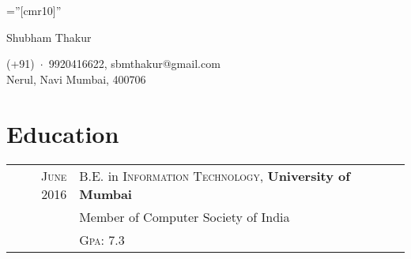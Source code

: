 \documentclass[a4paper,10pt]{article}
\begin{document}

\pagestyle{empty} %

\font\fb=''[cmr10]'' %

\par{\centering
		{\Huge Shubham Thakur
	}\bigskip\par}
\begin{center}
        \textsc (+91)~$\cdot$~9920416622, sbmthakur@gmail.com \\
	    \textsc Nerul, Navi Mumbai, 400706 \\
	    
\end{center}

\section{Education}
\begin{tabular}{rl}	
 \textsc{June} 2016 & B.E. in \textsc{Information Technology}, \textbf{University of Mumbai} \\
& Member of Computer Society of India\\
& \textsc{Gpa}: 7.3\\
\end{tabular}

\end{document}
